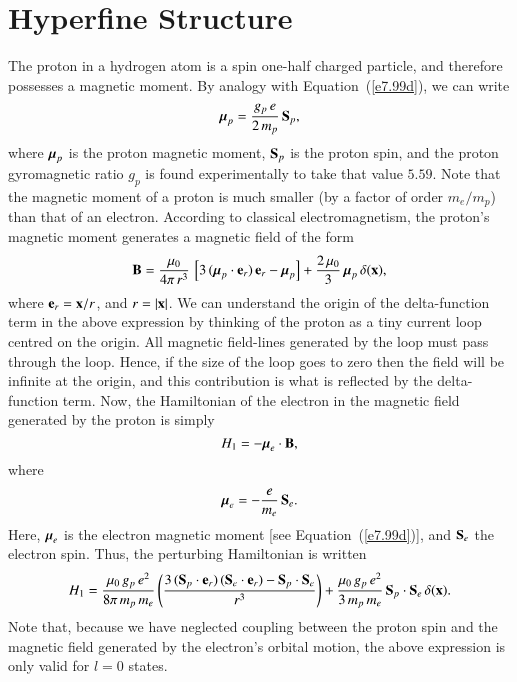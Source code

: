 \section{Hyperfine Structure}
The proton in a hydrogen atom is a spin one-half charged particle, and therefore
possesses a magnetic moment. By analogy with Equation~(\ref{e7.99d}),
we can write
\begin{equation}\label{e12.151}
\mbox{\boldmath$\mu$}_p = \frac{g_p\,e}{2\,m_p}\,{\bf S}_p,
\end{equation}
where $\mbox{\boldmath$\mu$}_p$ is the proton magnetic
moment, ${\bf S}_p$ is the proton spin, and the proton gyromagnetic ratio $g_p$ is found experimentally to take that value $5.59$. Note that the
magnetic moment of a proton is much smaller (by a factor of order $m_e/m_p$)
than that of an electron.
 According
to classical electromagnetism, the proton's magnetic moment generates a
magnetic field of the form
\begin{equation}
{\bf B} = \frac{\mu_0}{4\pi\,r^3}\,\left[3\,(\mbox{\boldmath$\mu$}_p\cdot{\bf e}_r)\,{\bf e}_r - \mbox{\boldmath$\mu$}_p\right] + \frac{2\,\mu_0}{3}\,\mbox{\boldmath$\mu$}_p\,\delta({\bf x}),
\end{equation}
where ${\bf e}_r = {\bf x}/r$, and $r=|{\bf x}|$. We can understand the origin of the delta-function term
in the above expression by thinking of the proton as a tiny current loop centred on the origin.
All magnetic field-lines generated by the loop must pass through the loop.
Hence, if the size of the  loop goes to zero then the field will be infinite at the origin, and this contribution is what is reflected by the delta-function term. Now, the Hamiltonian of the electron in the magnetic
field generated by the proton is simply
\begin{equation}
H_1 = - \mbox{\boldmath$\mu$}_e\cdot {\bf B},
\end{equation}
where
\begin{equation}
\mbox{\boldmath$\mu$}_e = - \frac{e}{m_e}\,{\bf S}_e.
\end{equation}
Here, $\mbox{\boldmath$\mu$}_e$ is the electron  magnetic moment [see Equation~(\ref{e7.99d})], and ${\bf S}_e$ the electron spin. Thus, the
perturbing Hamiltonian is written
\begin{equation}
H_1=\frac{\mu_0\,g_p\,e^2}{8\pi\,m_p\,m_e}\left(\frac{3\,({\bf S}_p\cdot{\bf e}_r)\,({\bf S}_e\cdot{\bf e}_r) - {\bf S}_p\cdot{\bf S}_e}{r^3}\right) + \frac{\mu_0\,g_p\,e^2}{3\,m_p\,m_e}\,{\bf S}_p\cdot{\bf S}_e\,\delta({\bf x}).
\end{equation}
Note that, because we have neglected coupling between the proton
spin and the magnetic field generated by the electron's orbital motion,
the above expression is only valid for $l=0$ states.

